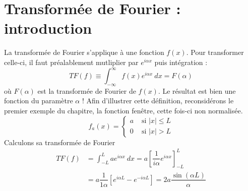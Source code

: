 \newpage
\section{Transformée de Fourier : introduction}
La transformée de Fourier s'applique à une fonction $f(x)$. Pour transformer celle-ci, il 
faut préalablement mutliplier par $e^{i\alpha x}$ puis intégration :
\begin{equation}
TF(f) \equiv \int_{-\infty}^\infty f(x)e^{i\alpha x}\ dx = F(\alpha)
\end{equation}
où $F(\alpha)$ est la transformée de Fourier de $f(x)$. Le résultat est bien une fonction 
du paramètre $\alpha$ ! Afin d'illustrer cette définition, reconsidérons le premier exemple 
du chapitre, la fonction fenêtre, cette fois-ci non normalisée.
\begin{equation}
f_a(x) =\left\{\begin{array}{ll}
a &\text{ si } |x| \leq L\\
0 &\text{ si } |x| > L
\end{array}\right.
\end{equation}
Calculons sa transformée de Fourier
\begin{equation}
\begin{array}{ll}
TF(f) &= \int_{-L}^L ae^{i\alpha x}\ dx = a\left[\dfrac{1}{i\alpha}e^{i\alpha x}\right]^L_{-L}\\
&= a\dfrac{1}{1\alpha}\left[e^{i\alpha L}-e^{-i\alpha L}\right] = 2a\dfrac{\sin(\alpha L)}{\alpha}
\end{array}
\end{equation}

